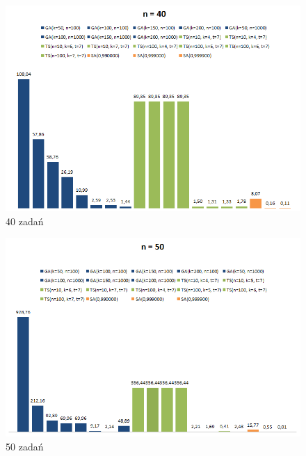 \documentclass[wide,a4paper,titlepage,12pt] {article}
\begin{document}
\begin{landscape}
\begin{figure}[htbp]
  \begin{center}
         \includegraphics[scale = 1.0]{img/all40.PNG}
         \caption{40 zadań}
  \end{center}
\end{figure}
\end{landscape}

\begin{landscape}
\begin{figure}[htbp]
  \begin{center}
         \includegraphics[scale = 1.0]{img/all50.PNG}
         \caption{50 zadań}
  \end{center}
\end{figure}
\end{landscape}
\end{document}
